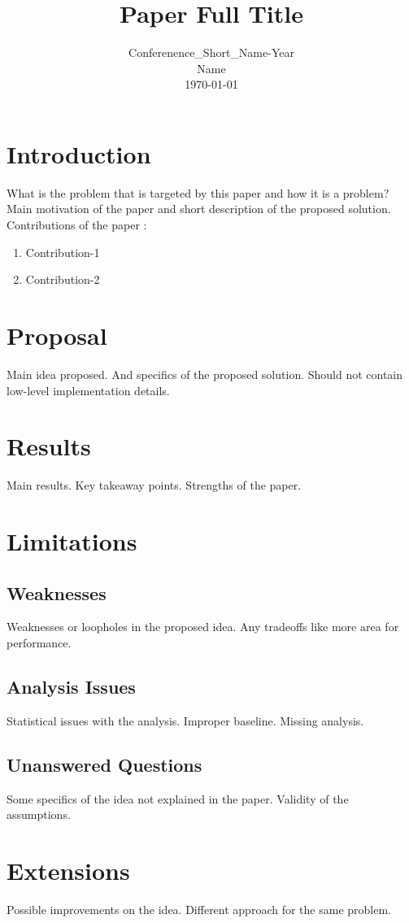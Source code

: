 \documentclass[conference]{IEEEtran}
\title{Paper Full Title}
\author{\normalsize{Conferenence\_Short\_Name-Year} \\ 
\normalsize{Name} \\ 
\normalsize{\today}}
\begin{document}
\maketitle
\thispagestyle{plain}
\pagestyle{plain}


\section{Introduction}
What is the problem that is targeted by this paper and how it is a problem?
Main motivation of the paper and short description of the proposed solution. \\

Contributions of the paper \cite{nicepaper1}:
\begin{enumerate}
    \item Contribution-1
    \item Contribution-2
\end{enumerate}



\section{Proposal}
Main idea proposed. And specifics of the proposed solution. 
Should not contain low-level implementation details.

\section{Results}
Main results. Key takeaway points. Strengths of the paper.


\section{Limitations}

\subsection{Weaknesses}
Weaknesses or loopholes in the proposed idea. Any tradeoffs like more area for
performance. 

\subsection{Analysis Issues}
Statistical issues with the analysis. Improper baseline. Missing analysis.

\subsection{Unanswered Questions}
Some specifics of the idea not explained in the paper. Validity of the assumptions.


\section{Extensions}
Possible improvements on the idea. Different approach for the same problem.






\end{document}
